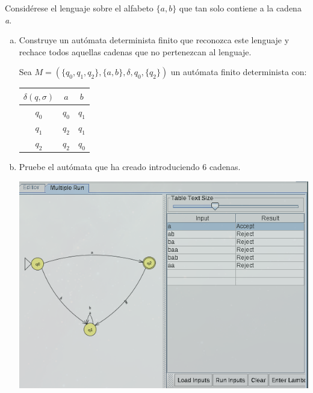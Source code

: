 Considérese el lenguaje sobre el alfabeto \( \{ a,b \} \) que tan solo contiene a la cadena \textit{a}.

\begin{enumerate}[a)]
  \item Construye un autómata determinista finito que reconozca este lenguaje y rechace todos aquellas cadenas que no pertenezcan al lenguaje.
    
    Sea \( M=(\{q_0,q_1,q_2\}, \{a,b\}, \delta, q_0, \{q_2\}) \) un autómata finito determinista con:

    \vspace{1cm}

    \begin{center}
      \begin{tabular}{|c|c|c|}
        \hline
        $\delta(q,\sigma)$ & $a$ & $b$\\
        \hline
        $q_0$& $q_0$ & $q_1$\\
        \hline
        $q_1$& $q_2$ & $q_1$\\
        \hline
        $q_2$& $q_2$ & $q_0$\\
        \hline
      \end{tabular}
    \end{center}

    \vspace{1cm}

    \begin{center}
    \end{center}

  \item Pruebe el autómata que ha creado introduciendo 6 cadenas.

    \includegraphics*[width = 0.8\columnwidth]{images/automata3.png}

\end{enumerate}
